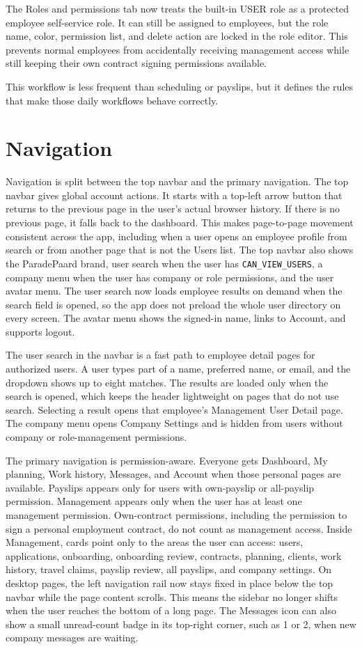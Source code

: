 \documentclass[11pt]{article}
\newcommand{\code}[1]{\nolinkurl{#1}}
\begin{document}
The Roles and permissions tab now treats the built-in USER role as a protected employee self-service role. It can still be assigned to employees, but the role name, color, permission list, and delete action are locked in the role editor. This prevents normal employees from accidentally receiving management access while still keeping their own contract signing permissions available.

This workflow is less frequent than scheduling or payslips, but it defines the rules that make those daily workflows behave correctly.

\section{Navigation}

Navigation is split between the top navbar and the primary navigation. The top navbar gives global account actions. It starts with a top-left arrow button that returns to the previous page in the user's actual browser history. If there is no previous page, it falls back to the dashboard. This makes page-to-page movement consistent across the app, including when a user opens an employee profile from search or from another page that is not the Users list. The top navbar also shows the ParadePaard brand, user search when the user has \code{CAN_VIEW_USERS}, a company menu when the user has company or role permissions, and the user avatar menu. The user search now loads employee results on demand when the search field is opened, so the app does not preload the whole user directory on every screen. The avatar menu shows the signed-in name, links to Account, and supports logout.

The user search in the navbar is a fast path to employee detail pages for authorized users. A user types part of a name, preferred name, or email, and the dropdown shows up to eight matches. The results are loaded only when the search is opened, which keeps the header lightweight on pages that do not use search. Selecting a result opens that employee's Management User Detail page. The company menu opens Company Settings and is hidden from users without company or role-management permissions.

The primary navigation is permission-aware. Everyone gets Dashboard, My planning, Work history, Messages, and Account when those personal pages are available. Payslips appears only for users with own-payslip or all-payslip permission. Management appears only when the user has at least one management permission. Own-contract permissions, including the permission to sign a personal employment contract, do not count as management access. Inside Management, cards point only to the areas the user can access: users, applications, onboarding, onboarding review, contracts, planning, clients, work history, travel claims, payslip review, all payslips, and company settings. On desktop pages, the left navigation rail now stays fixed in place below the top navbar while the page content scrolls. This means the sidebar no longer shifts when the user reaches the bottom of a long page. The Messages icon can also show a small unread-count badge in its top-right corner, such as 1 or 2, when new company messages are waiting.
\end{document}
